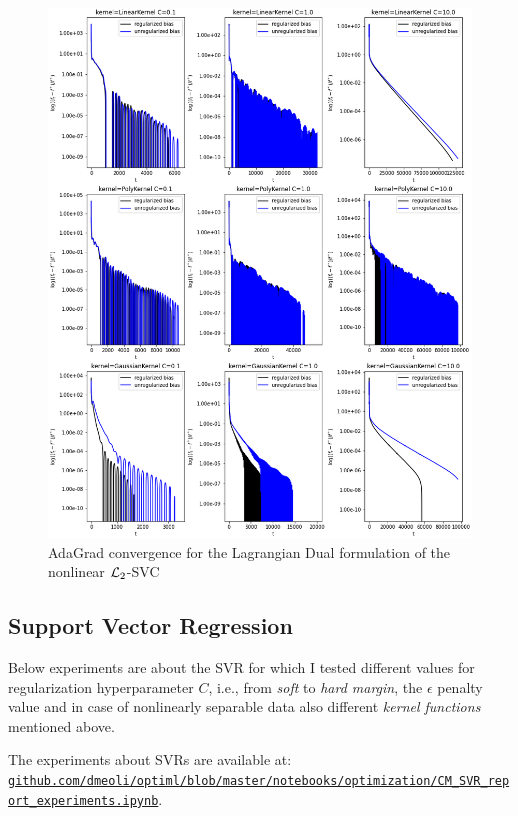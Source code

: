 \begin{figure}[H]
	\centering
	\includegraphics[scale=0.55]{img/lagrangian_dual_l2_svc_loss_history}
	\caption{AdaGrad convergence for the Lagrangian Dual formulation of the nonlinear $\protect \mathcal{L}_2$-SVC}
	\label{fig:lagrangian_dual_l2_svc_loss_history}
\end{figure}

\pagebreak

\subsection{Support Vector Regression}

Below experiments are about the SVR for which I tested different values for regularization hyperparameter $C$, i.e., from \emph{soft} to \emph{hard margin}, the $\epsilon$ penalty value and in case of nonlinearly separable data also different \emph{kernel functions} mentioned above.

The experiments about SVRs are available at: \\ \href{https://github.com/dmeoli/optiml/blob/master/notebooks/optimization/CM_SVR_report_experiments.ipynb}{\texttt{github.com/dmeoli/optiml/blob/master/notebooks/optimization/CM\_SVR\_report\_experiments.ipynb}}.

